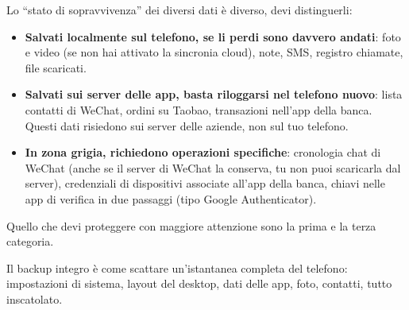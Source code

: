 


Lo “stato di sopravvivenza” dei diversi dati è diverso, devi distinguerli:

\begin{itemize}
  \item \textbf{Salvati localmente sul telefono, se li perdi sono davvero andati}: foto e video (se non hai attivato la sincronia cloud), note, SMS, registro chiamate, file scaricati.
  \item \textbf{Salvati sui server delle app, basta riloggarsi nel telefono nuovo}: lista contatti di WeChat, ordini su Taobao, transazioni nell'app della banca. Questi dati risiedono sui server delle aziende, non sul tuo telefono.
  \item \textbf{In zona grigia, richiedono operazioni specifiche}: cronologia chat di WeChat (anche se il server di WeChat la conserva, tu non puoi scaricarla dal server), credenziali di dispositivi associate all'app della banca, chiavi nelle app di verifica in due passaggi (tipo Google Authenticator).
\end{itemize}

Quello che devi proteggere con maggiore attenzione sono la prima e la terza categoria.


Il backup integro è come scattare un'istantanea completa del telefono: impostazioni di sistema, layout del desktop, dati delle app, foto, contatti, tutto inscatolato.


